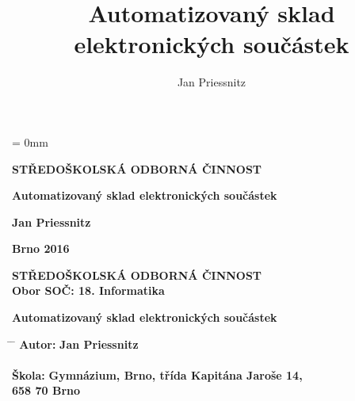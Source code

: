 \documentclass[12pt, a4paper, oneside]{article}
\author{Jan Priessnitz}
\title{Automatizovaný sklad elektronických součástek}
\begin{document}
\hoffset = 0mm

\pagestyle{empty} %

\enlargethispage{60mm} %

\begin{center}

\Large \textbf{STŘEDOŠKOLSKÁ ODBORNÁ ČINNOST}

\vspace{60mm}

\huge %
\textbf{Automatizovaný sklad elektronických součástek}

\Large

\vspace{90mm}


\textbf{Jan Priessnitz} \\

\vspace{40mm}

\textbf{Brno 2016}


\end{center}

\newpage %

\enlargethispage{60mm} %

\begin{center}

\Large \textbf{STŘEDOŠKOLSKÁ ODBORNÁ ČINNOST}  \\
\vspace{10mm}
 \normalsize
\textbf{Obor SOČ:  18. Informatika}

\vspace{45mm}

\LARGE %
\textbf{Automatizovaný sklad elektronických součástek}
\end{center}
\large

\vspace{50mm}


\begin{tabbing}
\hspace{10mm} \= \hspace{30mm}  \=   \kill %
  \> \textbf{Autor:}  \> \textbf{Jan Priessnitz}        \\
  \>              \>                               \\[8mm]
  \> \textbf{Škola:}   \> \textbf{Gymnázium, Brno, třída Kapitána Jaroše 14,}     \\
  \>              \> \textbf{ 658 70 Brno}    \\[8mm]

\end{tabbing}
\end{document}
